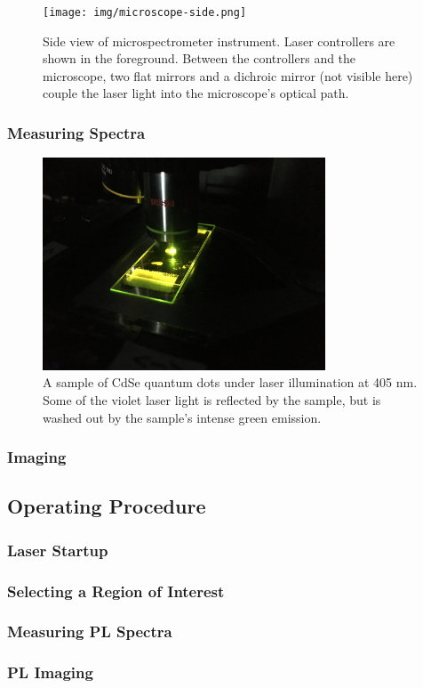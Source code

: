 \begin{figure}[H]
    \centering
    \texttt{[image: img/microscope-side.png]}
    \caption[Side view of microspectrometer instrument.]{Side view of microspectrometer instrument. Laser controllers are shown in the foreground. Between the controllers and the microscope, two flat mirrors and a dichroic mirror (not visible here) couple the laser light into the microscope's optical path.}
    \label{img:microscope-side}
\end{figure}


\subsubsection{Measuring Spectra}

\begin{figure}[H]
    \centering
    \includegraphics[width=0.75\textwidth]{img/objective-sample.JPG}
    \caption[Sample on stage under laser illumination.]{A sample of CdSe quantum dots under laser illumination at 405 nm. Some of the violet laser light is reflected by the sample, but is washed out by the sample's intense green emission.}
    \label{img:objective-sample}
\end{figure}


\subsubsection{Imaging}

\subsection{Operating Procedure}
\subsubsection{Laser Startup} %
\subsubsection{Selecting a Region of Interest}
\subsubsection{Measuring PL Spectra}
\subsubsection{PL Imaging}